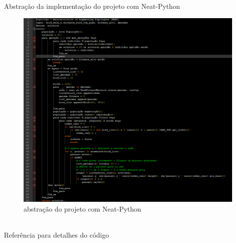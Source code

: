 Abstração da implementação do projeto com Neat-Python
\begin{figure}[htpb!]
    \centering 
    \includegraphics[width=0.7\linewidth]{images/abstract.png}
    \caption{abstração do projeto com Neat-Python}
    \label{fig:gym}
\end{figure}\\
Referência para detalhes do código 
\cite{mygit}
  

%



